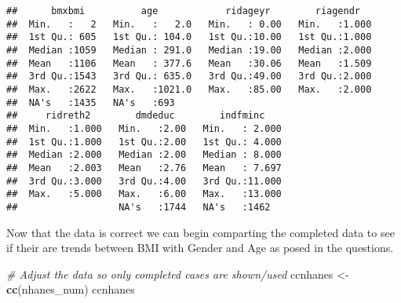 \documentclass[]{article}
\newenvironment{Shaded}{\begin{snugshade}}{\end{snugshade}}
\newcommand{\KeywordTok}[1]{\textcolor[rgb]{0.13,0.29,0.53}{\textbf{#1}}}
\newcommand{\StringTok}[1]{\textcolor[rgb]{0.31,0.60,0.02}{#1}}
\newcommand{\CommentTok}[1]{\textcolor[rgb]{0.56,0.35,0.01}{\textit{#1}}}
\newcommand{\NormalTok}[1]{#1}
\begin{document}
\begin{verbatim}
##      bmxbmi          age            ridageyr        riagendr    
##  Min.   :   2   Min.   :   2.0   Min.   : 0.00   Min.   :1.000  
##  1st Qu.: 605   1st Qu.: 104.0   1st Qu.:10.00   1st Qu.:1.000  
##  Median :1059   Median : 291.0   Median :19.00   Median :2.000  
##  Mean   :1106   Mean   : 377.6   Mean   :30.06   Mean   :1.509  
##  3rd Qu.:1543   3rd Qu.: 635.0   3rd Qu.:49.00   3rd Qu.:2.000  
##  Max.   :2622   Max.   :1021.0   Max.   :85.00   Max.   :2.000  
##  NA's   :1435   NA's   :693                                     
##     ridreth2        dmdeduc        indfminc     
##  Min.   :1.000   Min.   :2.00   Min.   : 2.000  
##  1st Qu.:1.000   1st Qu.:2.00   1st Qu.: 4.000  
##  Median :2.000   Median :2.00   Median : 8.000  
##  Mean   :2.003   Mean   :2.76   Mean   : 7.697  
##  3rd Qu.:3.000   3rd Qu.:4.00   3rd Qu.:11.000  
##  Max.   :5.000   Max.   :6.00   Max.   :13.000  
##                  NA's   :1744   NA's   :1462
\end{verbatim}

Now that the data is correct we can begin comparting the completed data
to see if their are trends between BMI with Gender and Age as posed in
the questions.

\begin{Shaded}
\begin{Highlighting}[]
\CommentTok{# Adjust the data so only completed cases are shown/used}
\NormalTok{ccnhanes <-}\StringTok{ }\KeywordTok{cc}\NormalTok{(nhanes_num)}
\NormalTok{ccnhanes}
\end{Highlighting}
\end{Shaded}
\end{document}

